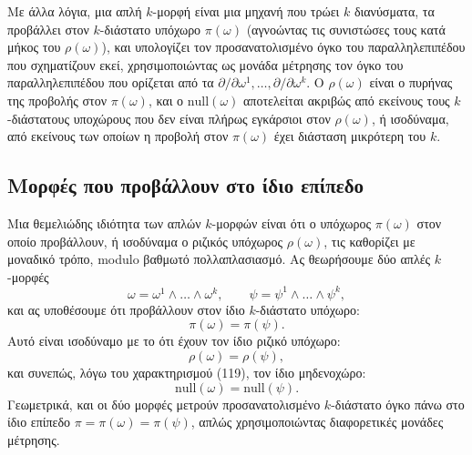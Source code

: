 \documentclass[12pt]{article}
\begin{document}
Με άλλα λόγια, μια απλή $k$-μορφή είναι μια μηχανή που τρώει $k$ διανύσματα, τα προβάλλει στον $k$-διάστατο υπόχωρο $\pi(\omega)$ (αγνοώντας τις συνιστώσες τους κατά μήκος του $\rho(\omega)$), και υπολογίζει τον προσανατολισμένο όγκο του παραλληλεπιπέδου που σχηματίζουν εκεί, χρησιμοποιώντας ως μονάδα μέτρησης τον όγκο του παραλληλεπιπέδου που ορίζεται από τα $\partial / \partial \omega^1, \dots, \partial / \partial \omega^k$. Ο $\rho(\omega)$ είναι ο πυρήνας της προβολής στον $\pi(\omega)$, και ο $\text{null}(\omega)$ αποτελείται ακριβώς από εκείνους τους $k$-διάστατους υποχώρους που δεν είναι πλήρως εγκάρσιοι στον $\rho(\omega)$, ή ισοδύναμα, από εκείνους των οποίων η προβολή στον $\pi(\omega)$ έχει διάσταση μικρότερη του $k$.

\subsection{Μορφές που προβάλλουν στο ίδιο επίπεδο}

Μια θεμελιώδης ιδιότητα των απλών $k$-μορφών είναι ότι ο υπόχωρος $\pi(\omega)$ στον οποίο προβάλλουν, ή ισοδύναμα ο ριζικός υπόχωρος $\rho(\omega)$, τις καθορίζει με μοναδικό τρόπο, modulo βαθμωτό πολλαπλασιασμό. Ας θεωρήσουμε δύο απλές $k$-μορφές
\[
\omega = \omega^1 \wedge \dots \wedge \omega^k, \qquad \psi = \psi^1 \wedge \dots \wedge \psi^k,
\]
και ας υποθέσουμε ότι προβάλλουν στον ίδιο $k$-διάστατο υπόχωρο:
\[
\pi(\omega) = \pi(\psi).
\]
Αυτό είναι ισοδύναμο με το ότι έχουν τον ίδιο ριζικό υπόχωρο:
\[
\rho(\omega) = \rho(\psi),
\]
και συνεπώς, λόγω του χαρακτηρισμού (119), τον ίδιο μηδενοχώρο:
\[
\text{null}(\omega) = \text{null}(\psi).
\]
Γεωμετρικά, και οι δύο μορφές μετρούν προσανατολισμένο $k$-διάστατο όγκο πάνω στο ίδιο επίπεδο $\pi = \pi(\omega) = \pi(\psi)$, απλώς χρησιμοποιώντας διαφορετικές μονάδες μέτρησης.
\end{document}
